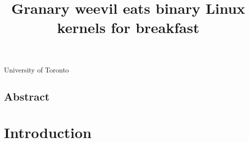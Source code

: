 \documentclass[preprint]{sigplanconf}
\begin{document}
\title{Granary weevil eats binary Linux kernels for breakfast}

{University of Toronto}{}

\maketitle
\subsection*{Abstract}



\section{Introduction}\label{sec:intro}
\end{document}
